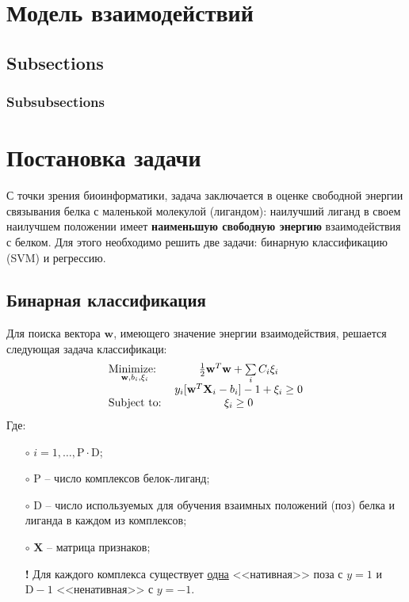 \documentclass[CEJM,PDF]{Class+Reg_in_Molec_Docking} %
\begin{document}
\section{Модель взаимодействий}


\subsection{Subsections}


\subsubsection{Subsubsections}

\section{Постановка задачи}

С точки зрения биоинформатики, задача заключается в оценке свободной энергии связывания белка с маленькой молекулой (лигандом): наилучший лиганд в своем наилучшем положении имеет \textbf{наименьшую свободную энергию} взаимодействия с белком. Для этого необходимо решить две задачи: бинарную классификацию (SVM) и регрессию. 

\subsection{Бинарная классификация}

Для поиска вектора $\mathbf{w}$, имеющего значение энергии взаимодействия, решается следующая задача классификаци:
\begin{eqnarray}
\begin{tabular}{lc}
$\underset{\mathbf{w}, b_i, \xi_{i}}{\text{Minimize: }}$&$ \frac{1}{2} \mathbf{w}^T\mathbf{w} + \sum\limits_{i}C_{i}\xi_{i}$ \\ 
\multirow{3}{*}{Subject to:}
&$y_{i}[\mathbf{w}^T\mathbf{X}_{i} - b_i]-1+\xi_{i} \geq 0$\\%
&$\xi_{i} \geq 0$
\end{tabular}
\label{eq:primal} 
\end{eqnarray}
Где:
\begin{enumerate}
    \item[$\circ$ ] $i = 1,\hdots,\text{P}\cdot \text{D}$;
    \item[$\circ$ ] P -- число комплексов белок-лиганд;
    \item[$\circ$ ] D -- число используемых для обучения взаимных положений (поз) белка и лиганда в каждом из комплексов;
    \item[$\circ$ ] $\mathbf{X}$ -- матрица признаков;
    \item[\textbf{!} ] Для каждого комплекса существует \underline{одна} <<нативная>> поза с $y = 1$ и \underline{$\text{D}-1$} <<ненативная>> с $y = -1$.
\end{enumerate}
\end{document}
